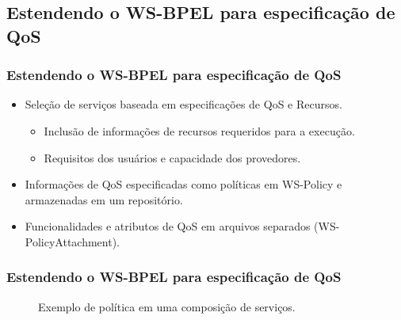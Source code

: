 \documentclass[red, cover=invisible, theme=Warsaw]{myslides}
\begin{document}
    \subsection{Estendendo o WS-BPEL para especificação de QoS}
	\begin{frame} \frametitle{Estendendo o WS-BPEL para especificação de QoS}
	    \begin{itemize}
		\item Seleção de serviços baseada em especificações de QoS e Recursos.
		    \begin{itemize}
			\item Inclusão de informações de recursos requeridos para a execução.
			\item Requisitos dos usuários e capacidade dos provedores.			
		    \end{itemize}
		\item Informações de QoS especificadas como políticas em WS-Policy e armazenadas em um repositório.
		\item Funcionalidades e atributos de QoS em arquivos separados (WS-PolicyAttachment).
	    \end{itemize}
	\end{frame}
	
	\begin{frame}[fragile]\frametitle{Estendendo o WS-BPEL para especificação de QoS}
 		\begin{figure}[!htb]
 		    \centering
		    
 		\caption{Exemplo de política em uma composição de serviços.}
 		\end{figure}
	\end{frame}
    
\end{document}
